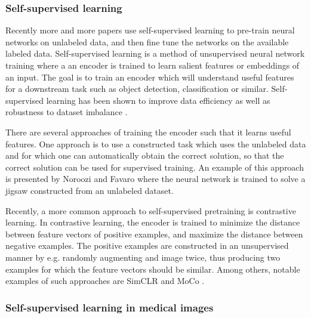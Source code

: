 \documentclass[conference]{IEEEtran}
\begin{document}
\subsubsection{Self-supervised learning}

Recently more and more papers use self-supervised learning to pre-train neural networks on
unlabeled data, and then fine tune the networks on the available labeled data.
Self-supervised learning is a method of unsupervised neural network training where a
an encoder is trained to learn salient features or embeddings of an input. The
goal is to train an encoder which will understand useful features for a downstream
task such as object detection, classification or similar. Self-supervised learning has
been shown to improve data efficiency
\cite{chenSimpleFrameworkContrastive2020} as well as robustness to dataset imbalance
\cite{liuSelfsupervisedLearningMore2021}.

There are several approaches of training the encoder such that it learns useful features.
One approach is to use a constructed task which uses the unlabeled data and for which one
can automatically obtain the correct solution, so that the correct solution can be used
for supervised training. An example of this approach is presented by Noroozi and Favaro 
\cite{norooziUnsupervisedLearningVisual2016} where the neural network is trained to 
solve a jigsaw constructed from an unlabeled dataset.

Recently, a more common approach to self-supervised pretraining is contrastive learning.
In contrastive learning, the encoder is trained to minimize the distance between feature
vectors of positive examples, and maximize the distance between negative examples. The
positive examples are constructed in an unsupervised manner by e.g. randomly augmenting
and image twice, thus producing two examples for which the feature vectors should be
similar. Among others, notable examples of such approaches are SimCLR 
\cite{chenSimpleFrameworkContrastive2020} and MoCo \cite{he2019moco}.

\subsubsection{Self-supervised learning in medical images}
\end{document}
